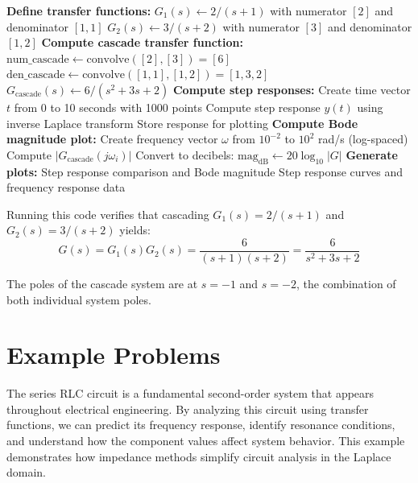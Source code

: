\begin{algorithm}
\caption{Cascaded First-Order System Analysis}
\begin{algorithmic}[1]
\State \textbf{Define transfer functions:}
\State $G_1(s) \gets 2/(s+1)$ with numerator $[2]$ and denominator $[1, 1]$
\State $G_2(s) \gets 3/(s+2)$ with numerator $[3]$ and denominator $[1, 2]$
\State
\State \textbf{Compute cascade transfer function:}
\State $\text{num\_cascade} \gets \text{convolve}([2], [3]) = [6]$
\State $\text{den\_cascade} \gets \text{convolve}([1,1], [1,2]) = [1, 3, 2]$
\State $G_{\text{cascade}}(s) \gets 6/(s^2 + 3s + 2)$
\State
\State \textbf{Compute step responses:}
\State Create time vector $t$ from 0 to 10 seconds with 1000 points
    \State Compute step response $y(t)$ using inverse Laplace transform
    \State Store response for plotting
\EndFor
\State
\State \textbf{Compute Bode magnitude plot:}
\State Create frequency vector $\omega$ from $10^{-2}$ to $10^{2}$ rad/s (log-spaced)
    \State Compute $|G_{\text{cascade}}(j\omega_i)|$
    \State Convert to decibels: $\text{mag}_{\text{dB}} \gets 20\log_{10}|G|$
\EndFor
\State
\State \textbf{Generate plots:} Step response comparison and Bode magnitude
\State \Return Step response curves and frequency response data
\end{algorithmic}
\end{algorithm}

Running this code verifies that cascading $G_1(s) = 2/(s+1)$ and $G_2(s) = 3/(s+2)$ yields:
\begin{equation}
G(s) = G_1(s)G_2(s) = \frac{6}{(s+1)(s+2)} = \frac{6}{s^2 + 3s + 2}
\end{equation}

The poles of the cascade system are at $s = -1$ and $s = -2$, the combination of both individual system poles.

\section{Example Problems}
\label{sec:examples}

\begin{examplebox}
The series RLC circuit is a fundamental second-order system that appears throughout electrical engineering. By analyzing this circuit using transfer functions, we can predict its frequency response, identify resonance conditions, and understand how the component values affect system behavior. This example demonstrates how impedance methods simplify circuit analysis in the Laplace domain.
\end{examplebox}


